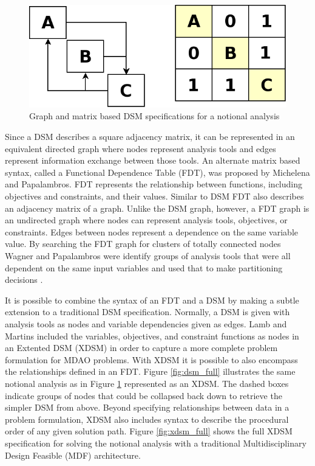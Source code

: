 \documentclass[]{aiaa-tc} %
\begin{document}
    \begin{figure}[!hbp]
        \begin{center}
        \includegraphics[width=.75\textwidth]{images/dsm_simple}
        \caption{Graph and matrix based DSM specifications for a notional analysis \label{fig:dsm_simple}}
        \end{center}
    \end{figure}

    Since a DSM describes a square adjacency matrix, it can be represented in an equivalent directed graph where nodes represent analysis tools and 
    edges represent information exchange between those tools. An alternate matrix based syntax, called a 
    Functional Dependence Table (FDT), was proposed by Michelena and Papalambros. 
    FDT represents the relationship between functions, including objectives and constraints, and their values\cite{Michelena1997}. Similar to DSM
    FDT also describes an adjacency matrix of a graph. Unlike the DSM graph, however, a FDT graph is an undirected 
    graph where nodes can represent analysis tools, objectives, or constraints. Edges between nodes represent a dependence on the same 
    variable value. By searching the FDT graph for clusters of totally connected nodes Wagner and Papalambros were identify groups of 
    analysis tools that were all dependent on the same input variables and used that to make partitioning decisions \cite{Wagner1993}. 

    It is possible to combine the syntax of an FDT and a DSM by making a subtle extension to a traditional DSM specification. Normally, a DSM is given 
    with analysis tools as nodes and variable dependencies given as edges. Lamb and Martins included the variables, objectives, and constraint functions
    as nodes in an Extented DSM (XDSM)\cite{Lambe2012} in order to capture a more complete problem formulation for MDAO problems. With XDSM 
    it is possible to also encompass the relationships defined in an FDT. Figure \ref{fig:dsm_full} 
    illustrates the same notional analysis as in Figure \ref{fig:dsm_simple} represented as an XDSM. 
    The dashed boxes indicate groups of nodes that could be collapsed back down to retrieve the simpler 
    DSM from above. Beyond specifying relationships between data in a problem formulation, XDSM also includes syntax to describe the
    procedural order of any given solution path. Figure \ref{fig:xdsm_full} shows the full XDSM specification for solving the notional 
    analysis with a traditional Multidisciplinary Design Feasible (MDF) architecture. 
\end{document}
